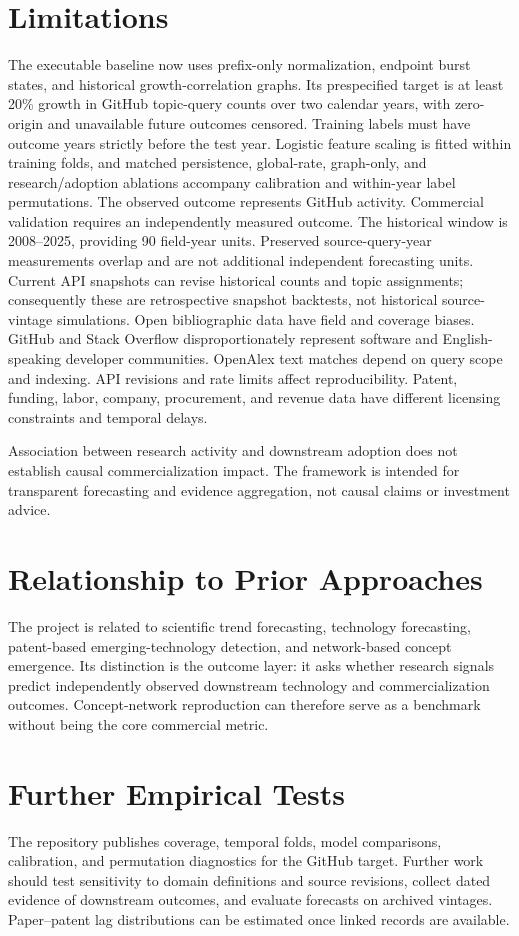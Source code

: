 \documentclass[11pt]{article}
\begin{document}
\section{Limitations}
The executable baseline now uses prefix-only normalization, endpoint burst
states, and historical growth-correlation graphs. Its prespecified target is
at least 20\% growth in GitHub topic-query counts over two calendar years,
with zero-origin and unavailable future outcomes censored. Training labels must
have outcome years strictly before the test year. Logistic feature scaling is
fitted within training folds, and matched persistence, global-rate, graph-only,
and research/adoption ablations accompany calibration and within-year label
permutations. The observed outcome represents GitHub activity. Commercial
validation requires an independently measured outcome.
The historical window is 2008--2025, providing 90 field-year units. Preserved
source-query-year measurements overlap and are not additional independent
forecasting units. Current API snapshots can revise historical counts and topic
assignments; consequently these are retrospective snapshot backtests, not
historical source-vintage simulations.
Open bibliographic data have field and coverage biases. GitHub and Stack Overflow disproportionately represent software and English-speaking developer communities. OpenAlex text matches depend on query scope and indexing. API revisions and rate limits affect reproducibility. Patent, funding, labor, company, procurement, and revenue data have different licensing constraints and temporal delays.

Association between research activity and downstream adoption does not establish causal commercialization impact. The framework is intended for transparent forecasting and evidence aggregation, not causal claims or investment advice.
\section{Relationship to Prior Approaches}
The project is related to scientific trend forecasting, technology forecasting, patent-based emerging-technology detection, and network-based concept emergence. Its distinction is the outcome layer: it asks whether research signals predict independently observed downstream technology and commercialization outcomes. Concept-network reproduction can therefore serve as a benchmark without being the core commercial metric.
\section{Further Empirical Tests}
The repository publishes coverage, temporal folds, model comparisons, calibration, and permutation diagnostics for the GitHub target. Further work should test sensitivity to domain definitions and source revisions, collect dated evidence of downstream outcomes, and evaluate forecasts on archived vintages. Paper--patent lag distributions can be estimated once linked records are available.
\end{document}
